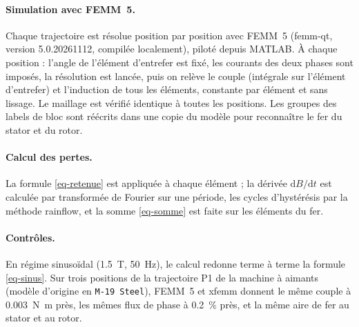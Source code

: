 \documentclass[11pt,a4paper]{article}
\newcommand{\dd}{\mathrm{d}}
\begin{document}
\paragraph{Simulation avec FEMM~5.} Chaque trajectoire est résolue position par position avec FEMM~5 (femm-qt, version 5.0.20261112, compilée localement), piloté depuis MATLAB. À chaque position : l'angle de l'élément d'entrefer est fixé, les courants des deux phases sont imposés, la résolution est lancée, puis on relève le couple (intégrale sur l'élément d'entrefer) et l'induction de tous les éléments, constante par élément et sans lissage. Le maillage est vérifié identique à toutes les positions. Les groupes des labels de bloc sont réécrits dans une copie du modèle pour reconnaître le fer du stator et du rotor.

\paragraph{Calcul des pertes.} La formule \eqref{eq-retenue} est appliquée à chaque élément ; la dérivée $\dd B/\dd t$ est calculée par transformée de Fourier sur une période, les cycles d'hystérésis par la méthode rainflow, et la somme \eqref{eq-somme} est faite sur les éléments du fer.

\paragraph{Contrôles.} En régime sinusoïdal (\SI{1.5}{\tesla}, \SI{50}{\hertz}), le calcul redonne terme à terme la formule \eqref{eq-sinus}. Sur trois positions de la trajectoire P1 de la machine à aimants (modèle d'origine en \texttt{M-19 Steel}), FEMM~5 et xfemm donnent le même couple à \SI{0.003}{\newton\metre} près, les mêmes flux de phase à \SI{0.2}{\percent} près, et la même aire de fer au stator et au rotor.
\end{document}
